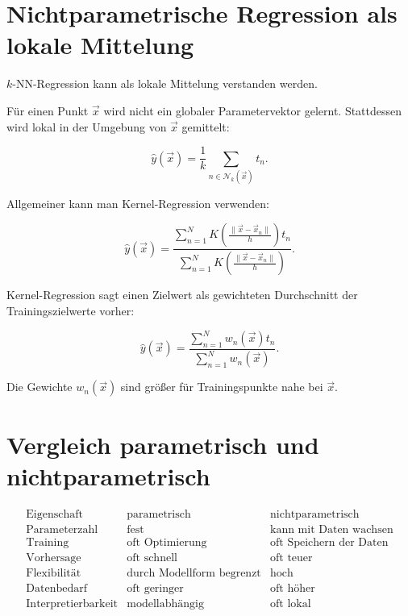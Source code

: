 \section{Nichtparametrische Regression als lokale Mittelung}

\(k\)-NN-Regression kann als lokale Mittelung verstanden werden.

Für einen Punkt \(\vec{x}\) wird nicht ein globaler Parametervektor gelernt.
Stattdessen wird lokal in der Umgebung von \(\vec{x}\) gemittelt:

\[
    \hat{y}(\vec{x})
    =
    \frac{1}{k}
    \sum_{n\in\mathcal{N}_k(\vec{x})}
    t_n.
\]

Allgemeiner kann man Kernel-Regression verwenden:

\[
    \hat{y}(\vec{x})
    =
    \frac{
        \sum_{n=1}^{N}
        K
        \left(
            \frac{\|\vec{x}-\vec{x}_n\|}{h}
        \right)
        t_n
    }{
        \sum_{n=1}^{N}
        K
        \left(
            \frac{\|\vec{x}-\vec{x}_n\|}{h}
        \right)
    }.
\]

\begin{definitionbox}
Kernel-Regression sagt einen Zielwert als gewichteten Durchschnitt der Trainingszielwerte vorher:

\[
    \hat{y}(\vec{x})
    =
    \frac{
        \sum_{n=1}^{N}
        w_n(\vec{x})t_n
    }{
        \sum_{n=1}^{N}
        w_n(\vec{x})
    }.
\]

Die Gewichte \(w_n(\vec{x})\) sind größer für Trainingspunkte nahe bei \(\vec{x}\).
\end{definitionbox}

\section{Vergleich parametrisch und nichtparametrisch}

\[
\begin{array}{c|c|c}
\text{Eigenschaft}
&
\text{parametrisch}
&
\text{nichtparametrisch}
\\
\hline
\text{Parameterzahl}
&
\text{fest}
&
\text{kann mit Daten wachsen}
\\
\hline
\text{Training}
&
\text{oft Optimierung}
&
\text{oft Speichern der Daten}
\\
\hline
\text{Vorhersage}
&
\text{oft schnell}
&
\text{oft teuer}
\\
\hline
\text{Flexibilität}
&
\text{durch Modellform begrenzt}
&
\text{hoch}
\\
\hline
\text{Datenbedarf}
&
\text{oft geringer}
&
\text{oft höher}
\\
\hline
\text{Interpretierbarkeit}
&
\text{modellabhängig}
&
\text{oft lokal}
\end{array}
\]

